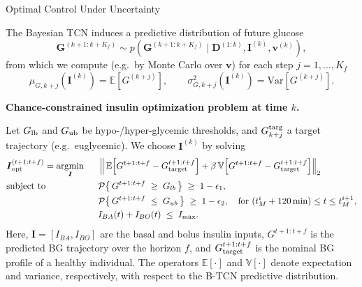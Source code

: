\documentclass[8pt,xcolor=dvipsnames,compress]{beamer}
\newcommand{\bs}{\boldsymbol}
\begin{document}

\begin{frame}{Optimal Control Under Uncertainty}
\small

The Bayesian TCN induces a predictive distribution of future glucose
\[
  \bs G^{(k+1:k+K_f)} 
  \sim p\!\left(\bs G^{(k+1:k+K_f)} 
        \mid \bs D^{(1:k)}, \bs I^{(k)}, \bs v^{(k)} \right),
\]
from which we compute (e.g.\ by Monte Carlo over $\bs v$) for each step $j=1,\dots,K_f$
\[
  \mu_{G,k+j}(\bs I^{(k)}) = \mathbb{E}\!\left[G^{(k+j)}\right],
  \qquad
  \sigma_{G,k+j}^2(\bs I^{(k)}) = \mathrm{Var}\!\left[G^{(k+j)}\right].
\]

\medskip
\textbf{Chance-constrained insulin optimization problem at time $k$.}

Let $G_{\rm lb}$ and $G_{\rm ub}$ be hypo-/hyper-glycemic thresholds, 
and $G^{\rm targ}_{k+j}$ a target trajectory (e.g.\ euglycemic). 
We choose $\bs I^{(k)}$ by solving
%
\begin{equation}\label{eq:optimal_control}
    \begin{aligned}
        & \bs I_{\rm opt}^{(t+1:t+f)} 
        = \underset{\bs I}{\rm argmin}\;\;
        && \left\|\, \mathbb{E}\!\left[G^{t+1:t+f} - G_{\rm target}^{t+1:t+f}\right] 
        + \beta \,\mathbb{V}\!\left[G^{t+1:t+f} - G_{\rm target}^{t+1:t+f}\right] \right\|_2  \\
        & \text{subject to}
        && \mathcal{P}\!\left\{\, G^{t+1:t+f} \;\geq\; G_{lb} \,\right\} \;\geq\; 1-\epsilon_1,  \\
        &&& \mathcal{P}\!\left\{\, G^{t+1:t+f} \;\leq\; G_{ub} \,\right\} \;\geq\; 1-\epsilon_2, 
        \quad \text{for } (t_M^i + 120 \,\mathrm{min}) \leq t \leq t_M^{i+1}, \\
        &&& I_{BA}(t) + I_{BO}(t) \;\leq\; I_{\max}.
    \end{aligned}
\end{equation}
Here, $\bs I = [I_{BA}, I_{BO}]$ are the basal and bolus insulin inputs, 
$G^{t+1:t+f}$ is the predicted BG trajectory over the horizon $f$, 
and $G_{\rm target}^{t+1:t+f}$ is the nominal BG profile of a healthy individual. The operators $\mathbb{E}[\cdot]$ and $\mathbb{V}[\cdot]$ denote expectation and variance, respectively, with respect to the B-TCN predictive distribution.  
\end{frame}
\end{document}
